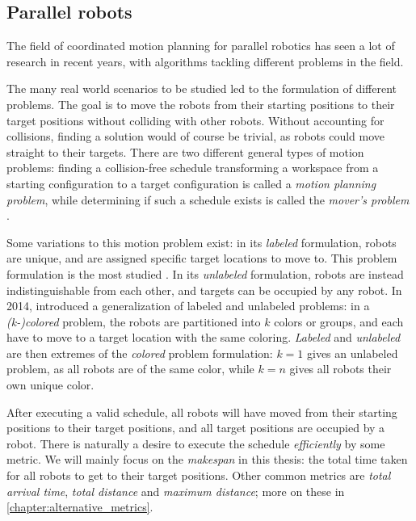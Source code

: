 \subsection{Parallel robots}

The field of coordinated motion planning for parallel robotics has seen a lot of research in recent years, with algorithms tackling different problems in the field.


The many real world scenarios to be studied led to the formulation of different problems.
The goal is to move the robots from their starting positions to their target positions without colliding with other robots.
Without accounting for collisions, finding a solution would of course be trivial, as robots could move straight to their targets.
There are two different general types of motion problems: finding a collision-free schedule transforming a workspace from a starting configuration to a target configuration is called a \emph{motion planning problem}, while determining if such a schedule exists is called the \emph{mover's problem} \cite{siamcomp/HopcroftW86}.

Some variations to this motion problem exist: in its \emph{labeled} formulation, robots are unique, and are assigned specific target locations to move to.
This problem formulation is the most studied \cite{fun/BrockenHKLS21}.
In its \emph{unlabeled} formulation, robots are instead indistinguishable from each other, and targets can be occupied by any robot.
In 2014, \cite{ijrr/SoloveyH14} introduced a generalization of labeled and unlabeled problems: in a \emph{(k-)colored} problem, the robots are partitioned into $k$ colors or groups, and each have to move to a target location with the same coloring.
\emph{Labeled} and \emph{unlabeled} are then extremes of the \emph{colored} problem formulation: $k=1$ gives an unlabeled problem, as all robots are of the same color, while $k=n$ gives all robots their own unique color.

After executing a valid schedule, all robots will have moved from their starting positions to their target positions, and all target positions are occupied by a robot.
There is naturally a desire to execute the schedule \emph{efficiently} by some metric.
We will mainly focus on the \emph{makespan} in this thesis: the total time taken for all robots to get to their target positions.
Other common metrics are \emph{total arrival time}, \emph{total distance} and \emph{maximum distance}; more on these in \cref{chapter:alternative_metrics}. 

